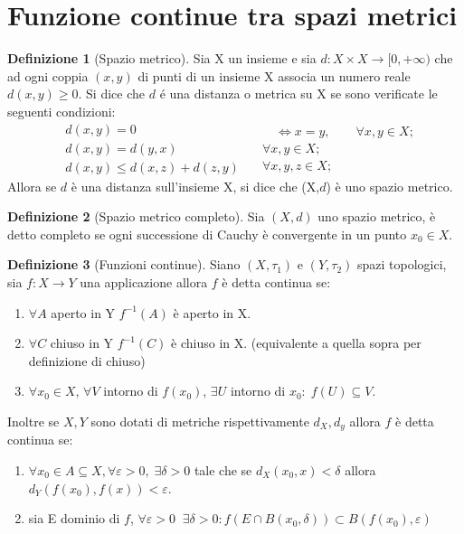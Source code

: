 \documentclass[leqno]{article}
\theoremstyle{definition}
\newtheorem{definition}{Definizione}[section]
\numberwithin{equation}{section}
\theoremstyle{remark}
\begin{document}
	\section{Funzione continue tra spazi metrici}
	\begin{definition}[Spazio metrico]
		Sia X un insieme e sia $d:X\times X \rightarrow [0,+ \infty)$ che ad ogni coppia $(x,y)$ di punti di un insieme X associa un numero reale $d(x,y)\ge 0$. Si dice che $d$ é una distanza o metrica su X se sono verificate le seguenti condizioni: 
		\begin{equation} 
			\begin{split}
				&d(x,y) = 0 \\
				&d(x,y)=d(y,x)\\
				&d(x,y)\le d(x,z) + d(z,y)
			\end{split}
			\quad
			\begin{split}
				\quad \Leftrightarrow x = y, \quad \quad \forall x,y \in X; \\
				\forall x,y \in X;\\
				\forall x,y,z \in X;
			\end{split}
		\end{equation}
		Allora se $d$ è una distanza sull'insieme X, si dice che (X,$d$) è uno spazio metrico.
	\end{definition}
	\begin{definition}[Spazio metrico completo]
		Sia $(X,d)$ uno spazio metrico, è detto completo se ogni successione di Cauchy è convergente in un punto $x_0 \in X$.
	\end{definition}
	\begin{definition}[Funzioni continue]
		Siano $(X,\tau_1)$ e $(Y,\tau_2)$ spazi topologici, sia $f: X\rightarrow Y$ una applicazione allora $f$ è detta continua se:
		\begin{enumerate}
			\item $\forall A$ aperto in Y $f^{-1}(A)$ è aperto in X.
			\item $\forall C$ chiuso in Y $f^{-1}(C)$ è chiuso in X. (equivalente a quella sopra per definizione di chiuso)
			\item $\forall x_0 \in X$, $\forall V$ intorno di $f(x_0)$, $\exists U$ intorno di $x_0 : \; f(U)\subseteq V$.
		\end{enumerate}
		Inoltre se $X,Y$ sono dotati di metriche rispettivamente $d_X, d_y$ allora $f$ è detta continua se:
		\begin{enumerate}
			\item $\forall x_0 \in A \subseteq X, \forall \varepsilon > 0, \; \exists \delta > 0$ tale che se $d_X(x_0,x)< \delta$ allora $d_Y(f(x_0),f(x)) < \varepsilon$.
			\item sia E dominio di $f$, $\forall \varepsilon > 0 \; \; \exists \delta > 0 : f(E \cap B(x_0,\delta)) \subset B(f(x_0),\varepsilon)$ 
		\end{enumerate}
	\end{definition}
\end{document}
